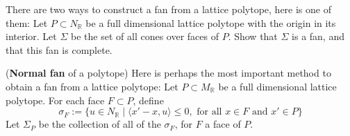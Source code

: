 \documentclass{exam}
\newcommand{\rr}{\mathbb{R}}
\begin{document}
\begin{questions}
    \question There are two ways to construct a fan from a lattice polytope, here is one of them:
    Let $P \subset N_\rr$ be a full dimensional lattice polytope with the origin in its interior.  Let
    $\Sigma$ be the set of all cones over faces of $P$.  Show that $\Sigma$ is a fan, and that
    this fan is complete.

    \question ({\bf Normal fan} of a polytope) Here is perhaps the most important method to obtain a fan from a lattice polytope:
    Let $P \subset M_\rr$ be a full dimensional lattice polytope.
    For each face $F \subset P$, define
    \[ \sigma_F := \{ u \in N_\rr \mid \langle x' - x, u \rangle \le 0, \mbox{ for all $x \in F$ and $x' \in P$} \}
    \]
    Let $\Sigma_P$ be the collection of all of the $\sigma_F$, for $F$ a face of $P$.

    
  \end{questions}
\end{document}

